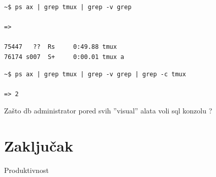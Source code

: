 \documentclass[times, utf8, seminar]{fit}
\begin{document}
\begin{lstlisting}
~$ ps ax | grep tmux | grep -v grep

=>

75447   ??  Rs     0:49.88 tmux
76174 s007  S+     0:00.01 tmux a
\end{lstlisting}

\begin{lstlisting}
~$ ps ax | grep tmux | grep -v grep | grep -c tmux

=> 2
\end{lstlisting}


Zašto db administrator pored svih ''visual'' alata voli sql konzolu ?


\chapter{Zaključak}

Produktivnost




\end{document}
